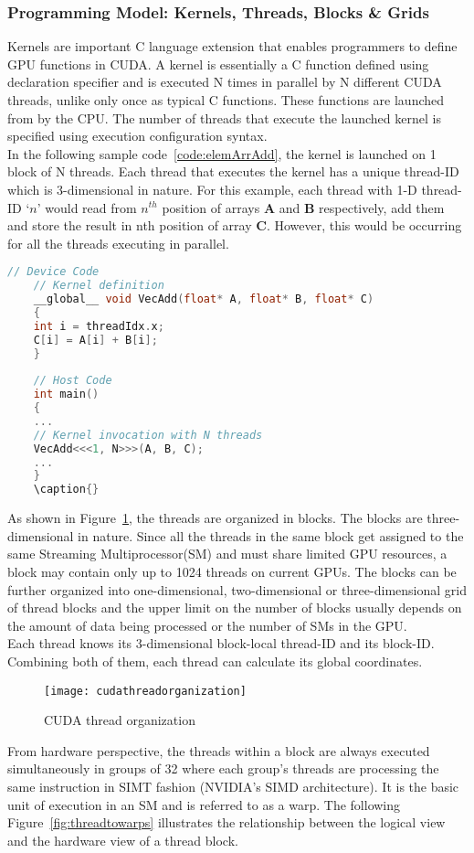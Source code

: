 \documentclass[thesis.tex]{subfiles}
\begin{document}
\subsubsection{Programming Model: Kernels, Threads, Blocks \& Grids}
Kernels are important C language extension that enables programmers to define GPU functions in CUDA. A kernel is essentially a C function defined using  declaration specifier and is executed N times in parallel by N different CUDA threads, unlike only once as typical C functions. These functions are launched from by the CPU. The number of threads that execute the launched kernel is specified using  execution configuration syntax. \\
In the following sample code~\ref{code:elemArrAdd}, the kernel  is launched on 1 block of N threads. Each thread that executes the kernel has a unique thread-ID which is 3-dimensional in nature. For this example, each thread with 1-D thread-ID ‘$n$’ would read from $n^{th}$ position of arrays \textbf{A} and \textbf{B} respectively, add them and store the result in nth position of array \textbf{C}. However, this would be occurring for all the threads executing in parallel.
\begin{lstlisting}[language=C, caption={Elementwise addition of two arrays A and B using CUDA}, captionpos=b, label={code:elemArrAdd}]
	// Device Code
	// Kernel definition
	__global__ void VecAdd(float* A, float* B, float* C)
	{
	int i = threadIdx.x;
	C[i] = A[i] + B[i];
	}
	
	// Host Code
	int main()
	{
	...
	// Kernel invocation with N threads
	VecAdd<<<1, N>>>(A, B, C);
	...
	}
	\caption{}
\end{lstlisting}
As shown in Figure~\ref{fig:cudathreadorganization}, the threads are organized in blocks. The blocks are three-dimensional in nature. Since all the threads in the same block get assigned to the same Streaming Multiprocessor(SM) and must share limited GPU resources, a block may contain only up to 1024 threads on current GPUs. The blocks can be further organized into one-dimensional, two-dimensional or three-dimensional grid of thread blocks and the upper limit on the number of blocks usually depends on the amount of data being processed or the number of SMs in the GPU.\\
Each thread knows its 3-dimensional block-local thread-ID and its block-ID. Combining both of them, each thread can calculate its global coordinates.
\begin{figure}[H]
	\centering
	\texttt{[image: cudathreadorganization]}
	\caption{CUDA thread organization~\cite{cuda}}
	\label{fig:cudathreadorganization}
\end{figure}
From hardware perspective, the threads within a block are always executed simultaneously in groups of 32 where each group’s threads are processing the same instruction in SIMT fashion (NVIDIA’s SIMD architecture). It is the basic unit of execution in an SM and is referred to as a warp. The following Figure~\ref{fig:threadtowarps} illustrates the relationship between the logical view and the hardware view of a thread block.
\end{document}
